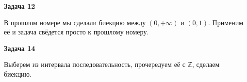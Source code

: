 \begin{center}
\textbf{Задача 12}
\end{center}
В прошлом номере мы сделали биекцию между $\displaystyle ( 0,+\infty )$ и $\displaystyle ( 0,1)$. Применим её и задача свёдется просто к прошлому номеру.

\begin{center}
\textbf{Задача 14}
\end{center}
Выберем из интервала последовательность, прочередуем её с $\displaystyle \mathbb{Z}$, сделаем биекцию.